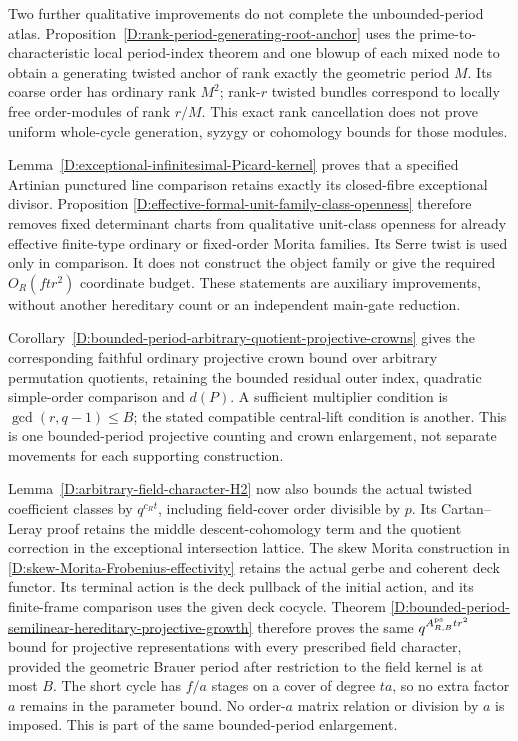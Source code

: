 Two further qualitative improvements do not complete the unbounded-period
atlas. Proposition~\ref{D:rank-period-generating-root-anchor} uses the
prime-to-characteristic local period-index theorem and one blowup of
each mixed node to obtain a generating twisted anchor of rank exactly
the geometric period $M$. Its coarse order has ordinary rank $M^2$;
rank-$r$ twisted bundles correspond to locally free order-modules of
rank $r/M$. This exact rank cancellation does not prove uniform
whole-cycle generation, syzygy or cohomology bounds for those modules.

Lemma~\ref{D:exceptional-infinitesimal-Picard-kernel} proves that a
specified Artinian punctured line comparison retains exactly its
closed-fibre exceptional divisor. Proposition
\ref{D:effective-formal-unit-family-class-openness} therefore removes
fixed determinant charts from qualitative unit-class openness for
already effective finite-type ordinary or fixed-order Morita families.
Its Serre twist is used only in comparison. It does not construct the
object family or give the required $O_R(ftr^2)$ coordinate budget.
These statements are auxiliary improvements, without another
hereditary count or an independent main-gate reduction.

Corollary~\ref{D:bounded-period-arbitrary-quotient-projective-crowns}
gives the corresponding faithful ordinary projective crown bound
over arbitrary permutation quotients, retaining the bounded
residual outer index, quadratic simple-order comparison and
$d(P)$. A sufficient multiplier condition is
$\gcd(r,q-1)\le B$; the stated compatible central-lift condition
is another. This is one bounded-period projective counting and
crown enlargement, not separate movements for each supporting
construction.

Lemma~\ref{D:arbitrary-field-character-H2} now also bounds the
actual twisted coefficient classes by $q^{c_Rt}$, including
field-cover order divisible by $p$. Its Cartan--Leray proof retains
the middle descent-cohomology term and the quotient correction in
the exceptional intersection lattice. The skew Morita construction
in \ref{D:skew-Morita-Frobenius-effectivity} retains the actual
gerbe and coherent deck functor. Its terminal action is the deck
pullback of the initial action, and its finite-frame comparison
uses the given deck cocycle. Theorem
\ref{D:bounded-period-semilinear-hereditary-projective-growth}
therefore proves the same $q^{A_{R,B}^{\rm ps}tr^2}$ bound for
projective representations with every prescribed field character,
provided the geometric Brauer period after restriction to the
field kernel is at most $B$. The short cycle has $f/a$ stages on
a cover of degree $ta$, so no extra factor $a$ remains in the
parameter bound. No order-$a$ matrix relation or division by $a$
is imposed. This is part of the same bounded-period enlargement.

